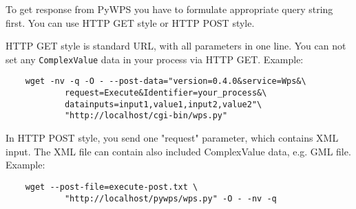 \documentclass[a4paper,11pt]{article}
\begin{document}
    To get response from PyWPS you have to formulate appropriate query string first. You can use HTTP GET style or HTTP POST style.
     
     
    HTTP GET style is standard URL, with all parameters in one line. You can not set any \texttt{ComplexValue} data in your process via HTTP GET. Example:
     
    \begin{verbatim}
    wget -nv -q -O - --post-data="version=0.4.0&service=Wps&\
            request=Execute&Identifier=your_process&\
            datainputs=input1,value1,input2,value2"\
            "http://localhost/cgi-bin/wps.py"
    \end{verbatim}
     
    In HTTP POST style, you send one "request" parameter, which contains XML input. The XML file can contain also included ComplexValue data, e.g. GML file. Example:
     
    \begin{verbatim}
    wget --post-file=execute-post.txt \
            "http://localhost/pywps/wps.py" -O - -nv -q
    \end{verbatim}
     
\end{document}
